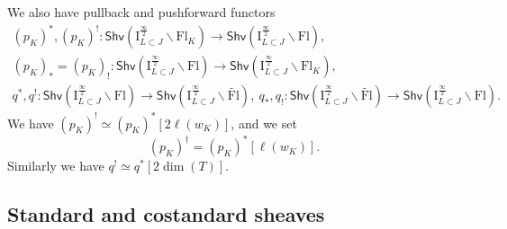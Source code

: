 \documentclass[11pt]{amsart}
\numberwithin{equation}{section}
\theoremstyle{plain}
\theoremstyle{definition}
\newcommand{\I}{{\mathrm I}}
\newcommand{\semi}{{{\frac{\infty}{2}}}}
\newcommand{\Shv}{\mathsf{Shv}}
\newcommand{\Fl}{\mathrm{Fl}}
\newcommand{\tFl}{\widetilde{\Fl}}
\begin{document}
We also have pullback and pushforward functors 
\begin{gather*}
(p_K)^*, (p_K)^!: \Shv \left( \I^\semi_{L \subset J} \backslash \Fl_K \right) \rightarrow \Shv \left(\I^\semi_{L \subset J}  \backslash \Fl \right), \\ 
(p_K)_* = (p_K)_!: \Shv \left( \I^\semi_{L \subset J} \backslash \Fl \right) \rightarrow \Shv \left( \I^\semi_{L \subset J}  \backslash \Fl_K \right), \\
q^*, q^!: \Shv \left( \I^\semi_{L \subset J} \backslash \Fl \right) \rightarrow \Shv \left( \I^\semi_{L \subset J} \backslash \tFl \right), \ 
q_*,q_!: \Shv \left( \I^\semi_{L \subset J}  \backslash \tFl \right) \rightarrow \Shv \left( \I^\semi_{L \subset J} \backslash \Fl \right). 
\end{gather*}
We have $(p_K)^! \simeq (p_K)^*[2 \ell(w_K)]$, and we set
\[
(p_K)^\dag = (p_K)^*[\ell(w_K)].
\]
Similarly we have $q^! \simeq q^*[2\dim(T)]$.

\subsection{Standard and costandard sheaves} 
\end{document}
